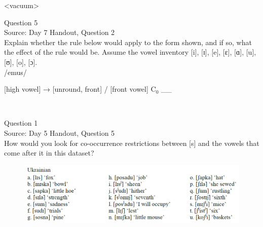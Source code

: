 \documentclass[12pt]{article}
\begin{document}
<vacuum>


\newpage

{\large Question 5}\\

Source: Day 7 Handout, Question 2\\

Explain whether the rule below would apply to the form shown, and if so, what the effect of the rule would be. Assume the vowel inventory [i], [ɪ], [e], [ɛ], [ɑ], [u], [ʊ], [o], [ɔ].\\

/emus/

{[high vowel]} →  {[unround, front]} / {[front vowel]} C$_0$ \_\_ 


\newpage

\begin{center}
\textbf{{\color{red}{\HUGE END OF EXAM}}}\\

\end{center}
\newpage

\begin{center}
\textbf{{\color{blue}{\HUGE START OF EXAM\\}}}

\textbf{{\color{blue}{\HUGE Student ID: 8951\\}}}

\textbf{{\color{blue}{\HUGE 1:00 - 1:15 PM\\}}}

\end{center}
\newpage

{\large Question 1}\\

Source: Day 5 Handout, Question 5\\

How would you look for co-occurrence restrictions between [s] and the vowels that come after it in this dataset?\\

\begin{figure}[H]
\includegraphics{../images/ukrainian.png}
\end{figure}
\end{document}
